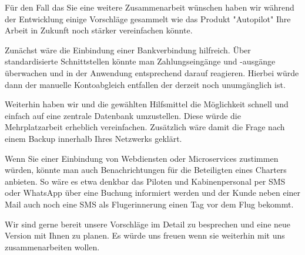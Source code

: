 \documentclass[12pt]{article}
\begin{document}
Für den Fall das Sie eine weitere Zusammenarbeit wünschen haben wir während der Entwicklung einige Vorschläge gesammelt wie das Produkt "Autopilot" Ihre Arbeit in Zukunft noch stärker vereinfachen könnte.
\newline

Zunächst wäre die Einbindung einer Bankverbindung hilfreich. Über standardisierte Schnittstellen könnte man Zahlungseingänge und -ausgänge überwachen und in der Anwendung entsprechend darauf reagieren. Hierbei würde dann der manuelle Kontoabgleich entfallen der derzeit noch unumgänglich ist.
\newline

Weiterhin haben wir und die gewählten Hilfsmittel die Möglichkeit schnell und einfach auf eine zentrale Datenbank umzustellen. Diese würde die Mehrplatzarbeit erheblich vereinfachen. Zusätzlich wäre damit die Frage nach einem Backup innerhalb Ihres Netzwerks geklärt.
\newline

Wenn Sie einer Einbindung von Webdiensten oder Microservices zustimmen würden, könnte man auch Benachrichtungen für die Beteiligten eines Charters anbieten. So wäre es etwa denkbar das Piloten und Kabinenpersonal per SMS oder WhatsApp über eine Buchung informiert werden und der Kunde neben einer Mail auch noch eine SMS als Flugerinnerung einen Tag vor dem Flug bekommt.
\newline

Wir sind gerne bereit unsere Vorschläge im Detail zu besprechen und eine neue Version mit Ihnen zu planen. Es würde uns freuen wenn sie weiterhin mit uns zusammenarbeiten wollen.
\end{document}
